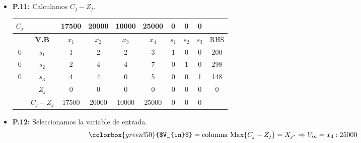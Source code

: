 \documentclass{templateNote}
\begin{document}
\begin{itemize}
    \newpage
    \item \textbf{P.11:} Calculamos $C_j - Z_j$.
    \begin{center}
        \begin{tabular}{|c|c|c|c|c|c|c|c|c|c|}
            \hline
            $C_j$ & & 17500 & 20000 & 10000 & 25000 & 0 & 0 & 0 & \\ \hline
            & \textbf{V.B} & $x_1$ & $x_2$ & $x_3$ & $x_4$ & $s_1$ & $s_2$ & $s_3$ & RHS \\ \hline
            0 & $s_1$ & 1 & 2 & 2 & 3 & 1 & 0 & 0 & 200 \\
            0 & $s_2$ & 2 & 4 & 4 & 7 & 0 & 1 & 0 & 298 \\
            0 & $s_3$ & 4 & 4 & 0 & 5 & 0 & 0 & 1 & 148 \\ \hline
            & $Z_j$ & 0 & 0 & 0 & 0 & 0 & 0 & 0 & $\underline{0}$ \\ \hline
            & $C_j - Z_j$ & 17500 & 20000 & 10000 & 25000 & 0 & 0 & 0 & \\ \hline
        \end{tabular}
    \end{center}

    \item \textbf{P.12:} Seleccionamos la variable de entrada.
    \begin{equation*}
        \colorbox{green!50}{$V_{in}$} = \text{columna Max} \{C_j-Z_j\} = X_{j^*} \Rightarrow V_{in} = x_4 : 25000
    \end{equation*}


\end{itemize}
\end{document}
